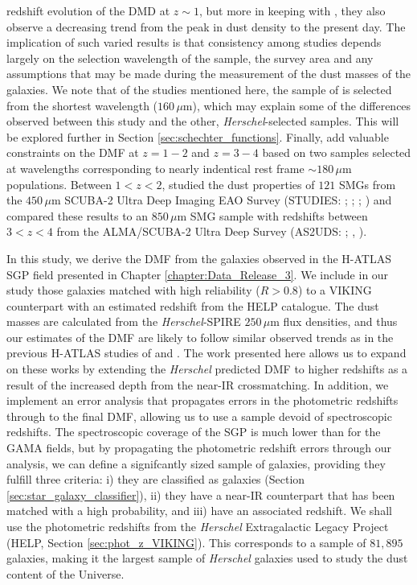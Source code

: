 redshift evolution of the DMD at $z \sim 1$, but more in keeping with \citealt{Dunne_2011}, they also observe a decreasing trend from the peak in dust density to the present day. The implication of such varied results is that consistency among studies depends largely on the selection wavelength of the sample, the survey area and any assumptions that may be made during the measurement of the dust masses of the galaxies. We note that of the studies mentioned here, the sample of \citealt{Pozzi_2020} is selected from the shortest wavelength ($160\,\mu$m), which may explain some of the differences observed between this study and the other, \textit{Herschel}-selected samples. This will be explored further in Section \ref{sec:schechter_functions}. Finally, \citealt{Dudzeviciute_2021} add valuable constraints on the DMF at $z = 1 - 2$ and $z = 3 - 4$ based on two samples selected at wavelengths corresponding to nearly indentical rest frame $\sim 180\,\mu$m populations. Between $1 < z < 2$, \citealt{Dudzeviciute_2021} studied the dust properties of $121$ SMGs from the $450\,\mu$m SCUBA-2 Ultra Deep Imaging EAO Survey (STUDIES: \citealt{Wang_2017}; \citealt{Chang_2018}; \citealt{Lim_2020b}; \citealt{Lim_2020c}) and compared these results to an $850\,\mu$m SMG sample with redshifts between $3 < z < 4$ from the ALMA/SCUBA-2 Ultra Deep Survey (AS2UDS: \citealt{Stach_2018}; \citealt{Stach_2019}, \citealt{Dudzeviciute_2020}). 

In this study, we derive the DMF from the galaxies observed in the H-ATLAS SGP field presented in Chapter \ref{chapter:Data_Release_3}. We include in our study those galaxies matched with high reliability ($R > 0.8$) to a VIKING counterpart with an estimated redshift from the HELP catalogue. The dust masses are calculated from the \textit{Herschel}-SPIRE $250\,\mu$m flux densities, and thus our estimates of the DMF are likely to follow similar observed trends as in the previous H-ATLAS studies of \citealt{Dunne_2011} and \citealt{Beeston_2018}. The work presented here allows us to expand on these works by extending the \textit{Herschel} predicted DMF to higher redshifts as a result of the increased depth from the near-IR crossmatching. In addition, we implement an error analysis that propagates errors in the photometric redshifts through to the final DMF, allowing us to use a sample devoid of spectroscopic redshifts. The spectroscopic coverage of the SGP is much lower than for the GAMA fields, but by propagating the photometric redshift errors through our analysis, we can define a signifcantly sized sample of galaxies, providing they fulfill three criteria: i) they are classified as galaxies (Section \ref{sec:star_galaxy_classifier}), ii) they have a near-IR counterpart that has been matched with a high probability, and iii) have an associated redshift. We shall use the photometric redshifts from the \textit{Herschel} Extragalactic Legacy Project (HELP, Section \ref{sec:phot_z_VIKING}). This corresponds to a sample of $81,895$ galaxies, making it the largest sample of \textit{Herschel} galaxies used to study the dust content of the Universe.

